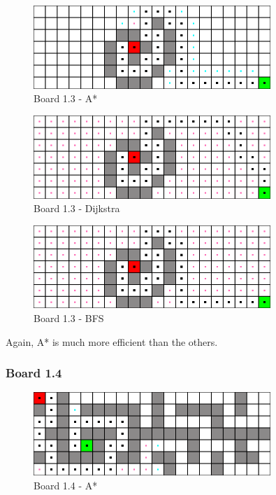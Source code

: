 \begin{figure}[h!]
  \centering
    \includegraphics[width=0.8\textwidth]{img/board-1-3-astar}
    \caption{Board 1.3 - A*}

\end{figure}

\begin{figure}[h!]
  \centering
    \includegraphics[width=0.8\textwidth]{img/board-1-3-dijkstra}
    \caption{Board 1.3 - Dijkstra}
\end{figure}

\begin{figure}[h!]
  \centering
    \includegraphics[width=0.8\textwidth]{img/board-1-3-bfs}
    \caption{Board 1.3 - BFS}
\end{figure}

Again, A* is much more efficient than the others.

\clearpage

\subsubsection*{Board 1.4}

\begin{figure}[h!]
  \centering
    \includegraphics[width=0.8\textwidth]{img/board-1-4-astar}
    \caption{Board 1.4 - A*}
\end{figure}

